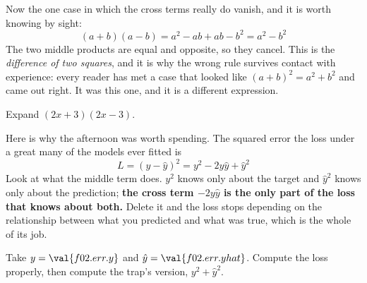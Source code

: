 
\begin{fr}
Now the one case in which the cross terms really do vanish, and it is worth
knowing by sight:
\[ (a + b)(a - b) = a^{2} - ab + ab - b^{2} = a^{2} - b^{2} \]
The two middle products are equal and opposite, so they cancel. This is the
\emph{difference of two squares}, and it is why the wrong rule survives contact
with experience: every reader has met a case that looked like
$(a+b)^{2} = a^{2} + b^{2}$ and came out right. It was this one, and it is a
different expression.

Expand $(2x + 3)(2x - 3)$.
\nextframe
\end{fr}

\begin{fr}
Here is why the afternoon was worth spending. The squared error \dash{} the
loss under a great many of the models ever fitted \dash{} is
\[ L = (y - \hat{y})^{2} = y^{2} - 2y\hat{y} + \hat{y}^{2} \]
Look at what the middle term does. $y^{2}$ knows only about the target and
$\hat{y}^{2}$ knows only about the prediction; \textbf{the cross term
$-2y\hat{y}$ is the only part of the loss that knows about both.} Delete it and
the loss stops depending on the relationship between what you predicted and
what was true, which is the whole of its job.

Take $y = \val{f02.err.y}$ and $\hat{y} = \val{f02.err.yhat}$. Compute the loss
properly, then compute the trap's version, $y^{2} + \hat{y}^{2}$.
\dotline
\nextframe
\end{fr}

